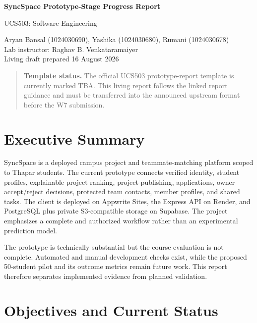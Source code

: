 \documentclass[11pt,a4paper]{article}
\begin{document}
\begin{center}
{\Large\bfseries SyncSpace Prototype-Stage Progress Report\par}
\vspace{3pt}
{\large UCS503: Software Engineering\par}
\vspace{6pt}
Aryan Bansal (1024030690), Yashika (1024030680), Rumani (1024030678) \\
Lab instructor: Raghav B. Venkataramaiyer \\
Living draft prepared 16 August 2026
\end{center}

\begin{quote}
\textbf{Template status.} The official UCS503 prototype-report template is currently marked TBA. This living report follows the linked report guidance and must be transferred into the announced upstream format before the W7 submission.
\end{quote}

\section{Executive Summary}

SyncSpace is a deployed campus project and teammate-matching platform scoped to Thapar students. The current prototype connects verified identity, student profiles, explainable project ranking, project publishing, applications, owner accept/reject decisions, protected team contacts, member profiles, and shared tasks. The client is deployed on Appwrite Sites, the Express API on Render, and PostgreSQL plus private S3-compatible storage on Supabase. The project emphasizes a complete and authorized workflow rather than an experimental prediction model.

The prototype is technically substantial but the course evaluation is not complete. Automated and manual development checks exist, while the proposed 50-student pilot and its outcome metrics remain future work. This report therefore separates implemented evidence from planned validation.

\section{Objectives and Current Status}
\end{document}
